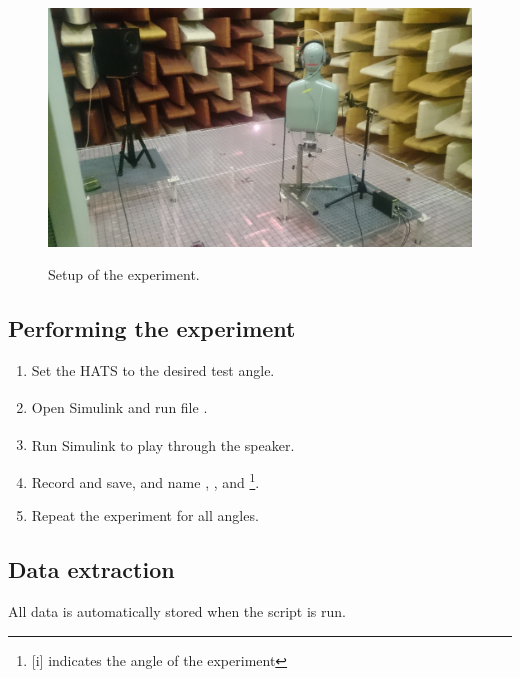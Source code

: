 \begin{figure}[H]
	\includegraphics[width=\textwidth]{../Journal/Experiments/AngleOfIncidence/AngInSetup.jpg}
	\label{AngIncidenceSetup}	
	\caption{Setup of the experiment.}
\end{figure}


\subsection{Performing the experiment}
\begin{enumerate}
	\item Set the HATS to the desired test angle. 
	\item Open Simulink\textsuperscript{\textregistered} and run file .
	\item Run Simulink\textsuperscript{\textregistered} to play  through the speaker.
	\item Record and save, and name , ,  and \footnote{[i] indicates the angle of the experiment}.
	\item Repeat the experiment for all angles.
\end{enumerate}



\subsection{Data extraction}

All data is automatically stored when the script  is run.



